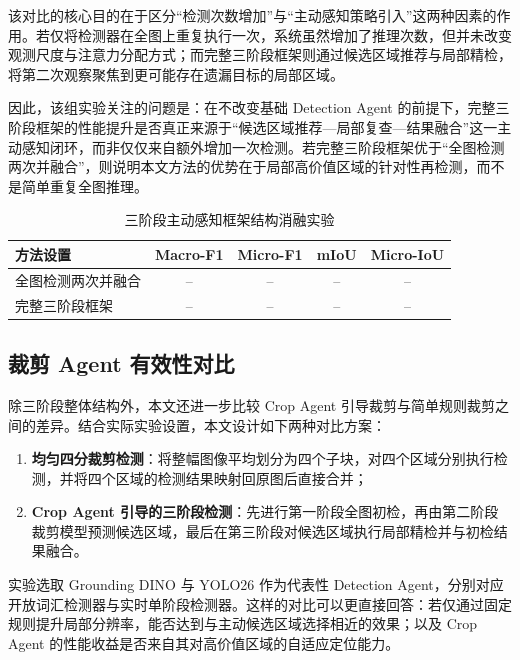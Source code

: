 该对比的核心目的在于区分“检测次数增加”与“主动感知策略引入”这两种因素的作用。若仅将检测器在全图上重复执行一次，系统虽然增加了推理次数，但并未改变观测尺度与注意力分配方式；而完整三阶段框架则通过候选区域推荐与局部精检，将第二次观察聚焦到更可能存在遗漏目标的局部区域。

因此，该组实验关注的问题是：在不改变基础 Detection Agent 的前提下，完整三阶段框架的性能提升是否真正来源于“候选区域推荐—局部复查—结果融合”这一主动感知闭环，而非仅仅来自额外增加一次检测。若完整三阶段框架优于“全图检测两次并融合”，则说明本文方法的优势在于局部高价值区域的针对性再检测，而不是简单重复全图推理。

\begin{table}[htbp]
    \centering
    \caption{三阶段主动感知框架结构消融实验}
    \label{tab:ablation_framework}
    \begin{tabular}{lcccc}
        \toprule
        方法设置 & Macro-F1 & Micro-F1 & mIoU & Micro-IoU \\
        \midrule
        全图检测两次并融合 & -- & -- & -- & -- \\
        完整三阶段框架 & -- & -- & -- & -- \\
        \bottomrule
    \end{tabular}
\end{table}

\subsection{裁剪 Agent 有效性对比}
\label{subsec:ablation_crop_agent}

除三阶段整体结构外，本文还进一步比较 Crop Agent 引导裁剪与简单规则裁剪之间的差异。结合实际实验设置，本文设计如下两种对比方案：

\begin{enumerate}
    \item \textbf{均匀四分裁剪检测}：将整幅图像平均划分为四个子块，对四个区域分别执行检测，并将四个区域的检测结果映射回原图后直接合并；
    \item \textbf{Crop Agent 引导的三阶段检测}：先进行第一阶段全图初检，再由第二阶段裁剪模型预测候选区域，最后在第三阶段对候选区域执行局部精检并与初检结果融合。
\end{enumerate}

实验选取 Grounding DINO 与 YOLO26 作为代表性 Detection Agent，分别对应开放词汇检测器与实时单阶段检测器。这样的对比可以更直接回答：若仅通过固定规则提升局部分辨率，能否达到与主动候选区域选择相近的效果；以及 Crop Agent 的性能收益是否来自其对高价值区域的自适应定位能力。

